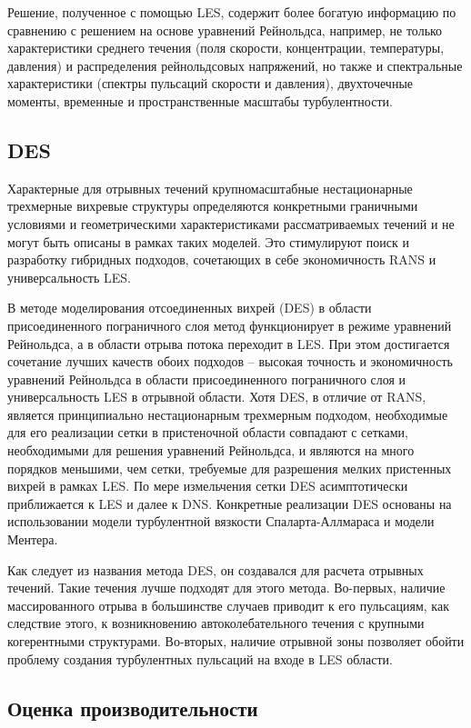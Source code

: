 	Решение, полученное с помощью LES, содержит более богатую информацию по сравнению с решением на основе уравнений Рейнольдса, например, не только характеристики среднего течения (поля скорости, концентрации, температуры, давления) и распределения рейнольдсовых напряжений, но также и спектральные характеристики (спектры пульсаций скорости и давления), двухточечные моменты, временные и пространственные масштабы турбулентности.

\subsection{DES}
	
	Характерные для отрывных течений крупномасштабные нестационарные трехмерные вихревые структуры определяются конкретными граничными условиями и геометрическими характеристиками рассматриваемых течений и не могут быть описаны в рамках таких моделей. Это стимулируют поиск и разработку гибридных подходов, сочетающих в себе экономичность RANS и универсальность LES.
	
	В методе моделирования отсоединенных вихрей (DES) в области присоединенного пограничного слоя метод функционирует в режиме уравнений Рейнольдса, а в области отрыва потока переходит в LES. При этом достигается сочетание лучших качеств обоих подходов -- высокая точность и экономичность уравнений Рейнольдса в области присоединенного пограничного слоя и универсальность LES в отрывной области. Хотя DES, в отличие от RANS, является принципиально нестационарным трехмерным подходом, необходимые для его реализации сетки в пристеночной области совпадают с сетками, необходимыми для решения уравнений Рейнольдса, и являются на много порядков меньшими, чем сетки, требуемые для разрешения мелких пристенных вихрей в рамках LES. По мере измельчения сетки DES асимптотически приближается к LES и далее к DNS. Конкретные реализации DES основаны на использовании модели турбулентной вязкости Спаларта-Аллмараса и модели Ментера\cite{Strelets2001}.
	
	Как следует из названия метода DES, он создавался для расчета отрывных течений. Такие течения лучше подходят для этого метода. Во-первых, наличие массированного отрыва в большинстве случаев приводит к его пульсациям, как следствие этого, к возникновению автоколебательного течения с крупными когерентными структурами. Во-вторых, наличие отрывной зоны позволяет обойти проблему создания турбулентных пульсаций на входе в LES области.
\subsection{Оценка производительности}
	
